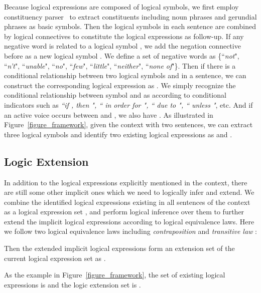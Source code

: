 \documentclass[11pt,a4paper]{article}
\begin{document}
Because logical expressions are composed of logical symbols, we first employ constituency parser~\cite{joshi2018extending} to extract constituents including noun phrases and gerundial phrases as basic symbols.
Then the logical symbols in each sentence are combined by logical connectives to constitute the logical expressions as follow-up. If any negative word is related to a logical symbol , we add the negation connective  before  as a new logical symbol .
We define a set of negative words as \{``\emph{not}", ``\emph{n't}", ``\emph{unable}", ``\emph{no}", ``\emph{few}", ``\emph{little}", ``\emph{neither}", ``\emph{none of}"\}.
Then if there is a conditional relationship between two logical symbols  and  in a sentence, we can construct the corresponding logical expression as .
We simply recognize the conditional relationship between symbol  and  as  according to conditional indicators such as \emph{``if , then ", `` in order for ", `` due to ", `` unless "}, etc.
And if an active voice occurs between  and , we also have . As illustrated in Figure~\ref{figure_framework}, given the context with two sentences, we can extract three logical symbols  and identify two existing logical expressions as  and .



\subsection{Logic Extension}
\label{sec:extension_step}
In addition to the logical expressions explicitly mentioned in the context, there are still some other implicit ones which we need to logically infer and extend.
We combine the identified logical expressions existing in all sentences of the context as a logical expression set , and perform logical inference over them to further extend the implicit logical expressions according to logical equivalence laws. Here we follow two logical equivalence laws including \emph{contraposition} \cite{russel2013artificial} and \emph{transitive law} \cite{zhao1997static}:

Then the extended implicit logical expressions form an extension set of the current logical expression set  as .

As the example in Figure~\ref{figure_framework}, the set of existing logical expressions is  and the logic extension set is .
\end{document}
